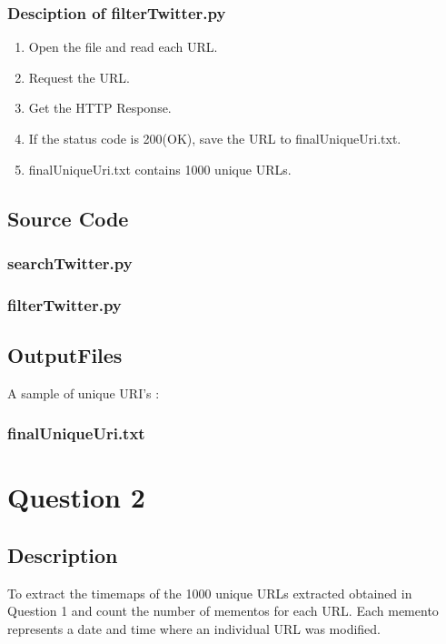\documentclass[12pt]{article}
\begin{document}
\subsubsection{Desciption of filterTwitter.py}
\begin{enumerate}
	\item Open the file and read each URL.
	\item Request the URL.
	\item Get the HTTP Response.
	\item If the status code is 200(OK), save the URL to finalUniqueUri.txt.
	\item finalUniqueUri.txt contains 1000 unique URLs.
\end{enumerate}

\newpage
\subsection{Source Code}
\subsubsection{searchTwitter.py}

\subsubsection{filterTwitter.py}

\newpage
\subsection{OutputFiles}
A sample of unique URI's :
\subsubsection{finalUniqueUri.txt}


\newpage
\section{Question 2}
\subsection{Description}
To extract the timemaps of the 1000 unique URLs extracted obtained in Question 1 and count the number of mementos for each URL. Each memento represents a date and time where an individual URL was modified.
\end{document}
